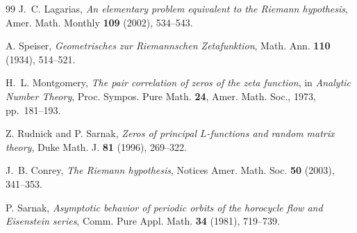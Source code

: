 \documentclass[12pt]{amsart}
\numberwithin{equation}{section}
\theoremstyle{definition}
\begin{document}
\begin{thebibliography}{99}
 J.~C. Lagarias,
\textit{An elementary problem equivalent to the Riemann hypothesis},
Amer. Math. Monthly \textbf{109} (2002), 534--543.

 A. Speiser,
\textit{Geometrisches zur Riemannschen Zetafunktion},
Math. Ann. \textbf{110} (1934), 514--521.

 H.~L. Montgomery,
\textit{The pair correlation of zeros of the zeta function},
in \textit{Analytic Number Theory}, Proc. Sympos. Pure Math. \textbf{24},
Amer. Math. Soc., 1973, pp.\ 181--193.

 Z. Rudnick and P. Sarnak,
\textit{Zeros of principal $L$-functions and random matrix theory},
Duke Math. J. \textbf{81} (1996), 269--322.

 J.~B. Conrey,
\textit{The Riemann hypothesis},
Notices Amer. Math. Soc. \textbf{50} (2003), 341--353.

 P. Sarnak,
\textit{Asymptotic behavior of periodic orbits of the horocycle flow and
Eisenstein series},
Comm. Pure Appl. Math. \textbf{34} (1981), 719--739.

\end{thebibliography}
\end{document}
